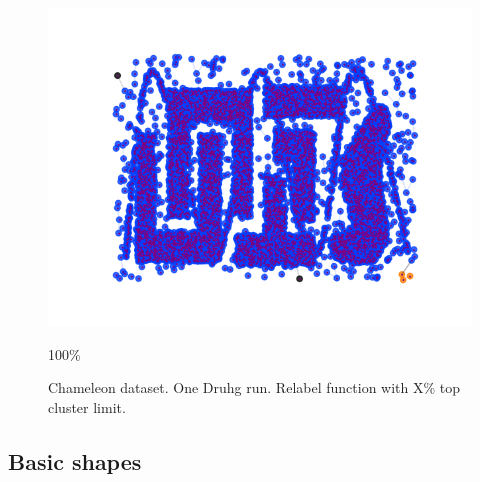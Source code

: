 \documentclass[12pt, a4paper, twocolumn]{article}
\newcommand{\githubPics}{https://raw.githubusercontent.com/artamono1/druhg/master/papers/druhg/}
\begin{document}
\begin{figure}[!htb]
\begin{minipage}[c]{0.40\linewidth}
    \href{\githubPics run_chameleon100.png}{\includegraphics[width=\linewidth]{run_chameleon100.png}}\caption*{100\%}
  \end{minipage}
  \caption{Chameleon dataset. One Druhg run. Relabel function with X\% top cluster limit.} \label{fig:Chameleon}
\end{figure}

\subsection{Basic shapes}
\end{document}
